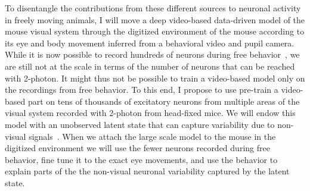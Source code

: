 \documentclass[B2,COG]{ercgrant}
\begin{document}
To disentangle the contributions from these different sources to neuronal activity in freely moving animals, I will move a deep video-based data-driven model of the mouse visual system through the digitized environment of the mouse according to its eye and body movement inferred from a behavioral video and pupil camera. 
While it is now possible to record hundreds of neurons during free behavior~\parencite{Parker2022-ac}, we are still not at the scale in terms of the number of neurons that can be reached with 2-photon. 
It might thus not be possible to train a video-based model only on the recordings from free behavior. 
To this end, I propose to use pre-train a video-based part on tens of thousands of excitatory neurons from multiple areas of the visual system recorded with 2-photon from head-fixed mice.
We will endow this model with an unobserved latent state that can capture variability due to non-visual signals~\parencite{Musall2019-kd, Bashiri2021-or}.
When we attach the large scale model to the mouse in the digitized environment we will use the fewer neurons recorded during free behavior, fine tune it to the exact eye movements, and use the behavior to explain parts of the the non-visual neuronal variability captured by the latent state.
\end{document}
